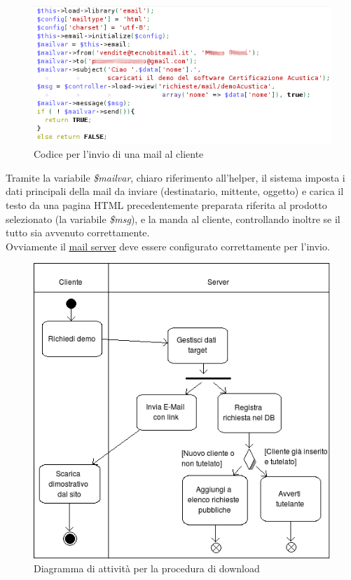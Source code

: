 \begin{figure}[!ht]
\centering
  \includegraphics[scale=0.8]{./images/codiceinviomail.png}
\caption{Codice per l'invio di una mail al cliente}
\label{mail_sending}
\end{figure}

\noindent
Tramite la variabile \textit{\$mailvar}, chiaro riferimento all'helper, il sistema imposta i dati principali della mail da inviare (destinatario, mittente, oggetto) e carica il testo da una pagina HTML precedentemente preparata riferita al prodotto selezionato (la variabile \textit{\$msg}), e la manda al cliente, controllando inoltre se il tutto sia avvenuto correttamente. \\
Ovviamente il \hyperlink{mail_server}{\underline{mail server}} deve essere configurato correttamente per l'invio.
\newpage


\begin{figure}[!ht]
\centering
  \includegraphics[scale=0.75]{./images/downloadAct.png}
\caption{Diagramma di attivit\`a per la procedura di download}
\label{download_act}
\end{figure}


